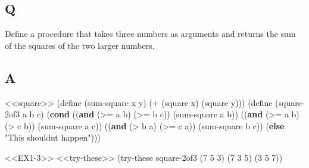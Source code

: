 \documentclass[
]{article}
\newenvironment{Shaded}{}{}
\newcommand{\DecValTok}[1]{\textcolor[rgb]{0.25,0.63,0.44}{#1}}
\newcommand{\ExtensionTok}[1]{#1}
\newcommand{\FunctionTok}[1]{\textcolor[rgb]{0.02,0.16,0.49}{#1}}
\newcommand{\KeywordTok}[1]{\textcolor[rgb]{0.00,0.44,0.13}{\textbf{#1}}}
\newcommand{\NormalTok}[1]{#1}
\newcommand{\OperatorTok}[1]{\textcolor[rgb]{0.40,0.40,0.40}{#1}}
\newcommand{\StringTok}[1]{\textcolor[rgb]{0.25,0.44,0.63}{#1}}
\begin{document}
\hypertarget{q-2}{%
\subsection{Q}\label{q-2}}

Define a procedure that takes three numbers as arguments and returns the
sum of the squares of the two larger numbers.

\hypertarget{a-2}{%
\subsection{A}\label{a-2}}

\hypertarget{EX1-3}{%
\label{EX1-3}}%
\begin{Shaded}
\begin{Highlighting}[numbers=left,,]
\NormalTok{\textless{}\textless{}square\textgreater{}\textgreater{}}
\NormalTok{(}\ExtensionTok{define}\FunctionTok{ }\NormalTok{(sum{-}square x y)}
\NormalTok{  (}\OperatorTok{+}\NormalTok{ (square x) (square y)))}
\NormalTok{(}\ExtensionTok{define}\FunctionTok{ }\NormalTok{(square{-}2of3 a b c)}
\NormalTok{  (}\KeywordTok{cond}\NormalTok{ ((}\KeywordTok{and}\NormalTok{ (}\OperatorTok{\textgreater{}=}\NormalTok{ a b) (}\OperatorTok{\textgreater{}=}\NormalTok{ b c)) (sum{-}square a b))}
\NormalTok{        ((}\KeywordTok{and}\NormalTok{ (}\OperatorTok{\textgreater{}=}\NormalTok{ a b) (}\OperatorTok{\textgreater{}}\NormalTok{ c b)) (sum{-}square a c))}
\NormalTok{        ((}\KeywordTok{and}\NormalTok{ (}\OperatorTok{\textgreater{}}\NormalTok{ b a) (}\OperatorTok{\textgreater{}=}\NormalTok{ c a)) (sum{-}square b c))}
\NormalTok{        (}\KeywordTok{else} \StringTok{"This shouldn\textquotesingle{}t happen"}\NormalTok{)))}
\end{Highlighting}
\end{Shaded}

\begin{Shaded}
\begin{Highlighting}[numbers=left,,]
\NormalTok{\textless{}\textless{}EX1{-}3\textgreater{}\textgreater{}}
\NormalTok{\textless{}\textless{}try{-}these\textgreater{}\textgreater{}}
\NormalTok{ (try{-}these square{-}2of3 \textquotesingle{}(}\DecValTok{7} \DecValTok{5} \DecValTok{3}\NormalTok{)}
\NormalTok{                        \textquotesingle{}(}\DecValTok{7} \DecValTok{3} \DecValTok{5}\NormalTok{)}
\NormalTok{                        \textquotesingle{}(}\DecValTok{3} \DecValTok{5} \DecValTok{7}\NormalTok{))}
\end{Highlighting}
\end{Shaded}
\end{document}
